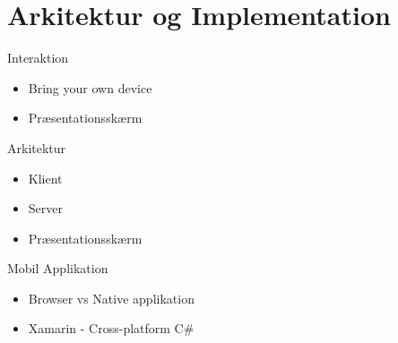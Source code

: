 \section{Arkitektur og Implementation}
\label{sub:arkitektur_og_implementation}
\begin{frame}{Interaktion}
	\begin{itemize}
		\item Bring your own device
		\item Præsentationsskærm
	\end{itemize}	
\end{frame}

\begin{frame}{Arkitektur}
	\begin{itemize}
		\item Klient
		\item Server
		\item Præsentationsskærm
	\end{itemize}
\end{frame}


\begin{frame}{Mobil Applikation}
	\begin{itemize}
		\item Browser vs Native applikation
		\item Xamarin - Cross-platform C\#
	\end{itemize}	
\end{frame}

